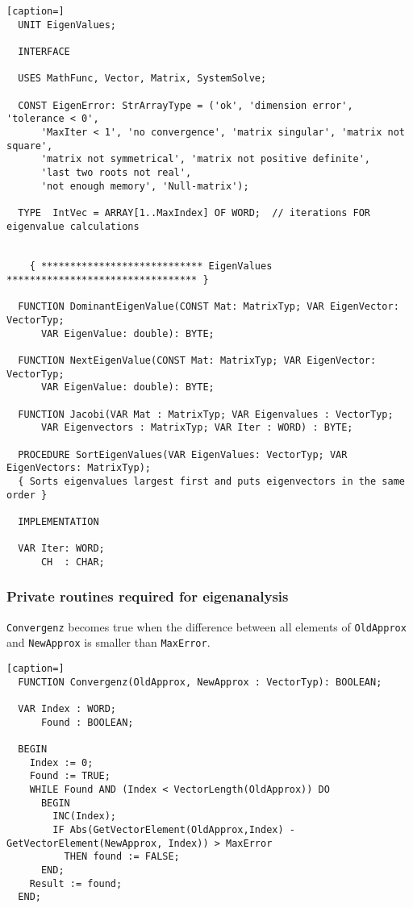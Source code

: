 \begin{lstlisting}[caption=]
  UNIT EigenValues;

  INTERFACE

  USES MathFunc, Vector, Matrix, SystemSolve;

  CONST EigenError: StrArrayType = ('ok', 'dimension error', 'tolerance < 0',
      'MaxIter < 1', 'no convergence', 'matrix singular', 'matrix not square',
      'matrix not symmetrical', 'matrix not positive definite',
      'last two roots not real',
      'not enough memory', 'Null-matrix');

  TYPE  IntVec = ARRAY[1..MaxIndex] OF WORD;  // iterations FOR eigenvalue calculations


    { **************************** EigenValues ********************************* }

  FUNCTION DominantEigenValue(CONST Mat: MatrixTyp; VAR EigenVector: VectorTyp;
      VAR EigenValue: double): BYTE;

  FUNCTION NextEigenValue(CONST Mat: MatrixTyp; VAR EigenVector: VectorTyp;
      VAR EigenValue: double): BYTE;

  FUNCTION Jacobi(VAR Mat : MatrixTyp; VAR Eigenvalues : VectorTyp;
      VAR Eigenvectors : MatrixTyp; VAR Iter : WORD) : BYTE;

  PROCEDURE SortEigenValues(VAR EigenValues: VectorTyp; VAR EigenVectors: MatrixTyp);
  { Sorts eigenvalues largest first and puts eigenvectors in the same order }

  IMPLEMENTATION

  VAR Iter: WORD;
      CH  : CHAR;
\end{lstlisting}


\subsubsection{Private routines required for eigenanalysis}

\texttt{Convergenz} becomes true when the difference between all elements of \texttt{OldApprox} and \texttt{NewApprox} is smaller than \texttt{MaxError}.

\begin{lstlisting}[caption=]
  FUNCTION Convergenz(OldApprox, NewApprox : VectorTyp): BOOLEAN;

  VAR Index : WORD;
      Found : BOOLEAN;

  BEGIN
    Index := 0;
    Found := TRUE;
    WHILE Found AND (Index < VectorLength(OldApprox)) DO
      BEGIN
        INC(Index);
        IF Abs(GetVectorElement(OldApprox,Index) - GetVectorElement(NewApprox, Index)) > MaxError
          THEN found := FALSE;
      END;
    Result := found;
  END;
\end{lstlisting}


